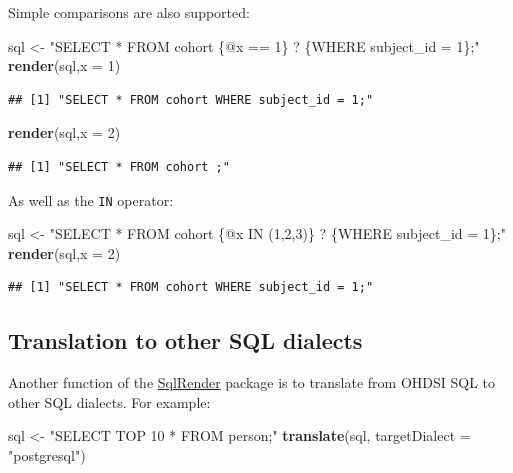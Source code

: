 \documentclass[11pt]{book}
\newenvironment{Shaded}{\begin{snugshade}}{\end{snugshade}}
\newcommand{\KeywordTok}[1]{\textcolor[rgb]{0.13,0.29,0.53}{\textbf{#1}}}
\newcommand{\DataTypeTok}[1]{\textcolor[rgb]{0.13,0.29,0.53}{#1}}
\newcommand{\DecValTok}[1]{\textcolor[rgb]{0.00,0.00,0.81}{#1}}
\newcommand{\StringTok}[1]{\textcolor[rgb]{0.31,0.60,0.02}{#1}}
\newcommand{\NormalTok}[1]{#1}
\begin{document}
Simple comparisons are also supported:

\begin{Shaded}
\begin{Highlighting}[]
\NormalTok{sql <-}\StringTok{ "SELECT * FROM cohort \{@x == 1\} ? \{WHERE subject_id = 1\};"}
\KeywordTok{render}\NormalTok{(sql,}\DataTypeTok{x =} \DecValTok{1}\NormalTok{)}
\end{Highlighting}
\end{Shaded}

\begin{verbatim}
## [1] "SELECT * FROM cohort WHERE subject_id = 1;"
\end{verbatim}

\begin{Shaded}
\begin{Highlighting}[]
\KeywordTok{render}\NormalTok{(sql,}\DataTypeTok{x =} \DecValTok{2}\NormalTok{)}
\end{Highlighting}
\end{Shaded}

\begin{verbatim}
## [1] "SELECT * FROM cohort ;"
\end{verbatim}

As well as the \texttt{IN} operator:

\begin{Shaded}
\begin{Highlighting}[]
\NormalTok{sql <-}\StringTok{ "SELECT * FROM cohort \{@x IN (1,2,3)\} ? \{WHERE subject_id = 1\};"}
\KeywordTok{render}\NormalTok{(sql,}\DataTypeTok{x =} \DecValTok{2}\NormalTok{)}
\end{Highlighting}
\end{Shaded}

\begin{verbatim}
## [1] "SELECT * FROM cohort WHERE subject_id = 1;"
\end{verbatim}

\subsection{Translation to other SQL
dialects}\label{translation-to-other-sql-dialects}

Another function of the
\href{https://ohdsi.github.io/SqlRender/}{SqlRender} package is to
translate from OHDSI SQL to other SQL dialects. For example:

\begin{Shaded}
\begin{Highlighting}[]
\NormalTok{sql <-}\StringTok{ "SELECT TOP 10 * FROM person;"}
\KeywordTok{translate}\NormalTok{(sql, }\DataTypeTok{targetDialect =} \StringTok{"postgresql"}\NormalTok{)}
\end{Highlighting}
\end{Shaded}
\end{document}
